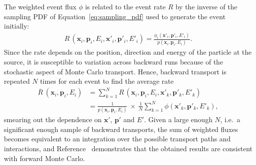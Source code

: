 The weighted event flux $\phi$ is related to the event rate $R$ by the
inverse of the sampling PDF of Equation~\ref{eq:sampling_pdf} used to generate
the event initially:
\begin{align*}
R\,(\bm{x}_i, \bm{p}_i, E_i, \bm{x}'_i, \bm{p}'_i, E'_i) = 
    \frac{\phi_i(\bm{x}'_i, \bm{p}'_i, E'_i)}{p(\bm{x}_i, \bm{p}_i, E_i)}.
\end{align*}
Since the rate depends on the position, direction and energy of the particle at
the source, it is susceptible to variation across backward runs because of the
stochastic aspect of Monte Carlo transport. Hence, backward transport is
repeated $N$ times for each event to find the average rate
\begin{align}\label{eq:avg_rate}
\overline{R}\:(\bm{x}_i, \bm{p}_i, E_i)
    &= \sum_{k=1}^N R\,(\bm{x}_i, \bm{p}_i, E_i, \bm{x}'_k, \bm{p}'_k, E'_k) \nonumber\\
    &= \frac{1}{p(\bm{x}_i, \bm{p}_i, E_i)} \ \times\ \frac{1}{N} \sum_{k=1}^N \phi(\bm{x}'_k, \bm{p}'_k, E'_k),
\end{align}
smearing out the dependence on $\bm{x}'$, $\bm{p}'$ and $E'$. Given a large
enough $N$, i.e.\ a significant enough sample of backward transports, the sum of
weighted fluxes becomes equivalent to an integration over the possible transport paths
and interactions, and Reference~\cite{DESORGHER2010247} demonstrates that the
obtained results are consistent with forward Monte Carlo.








